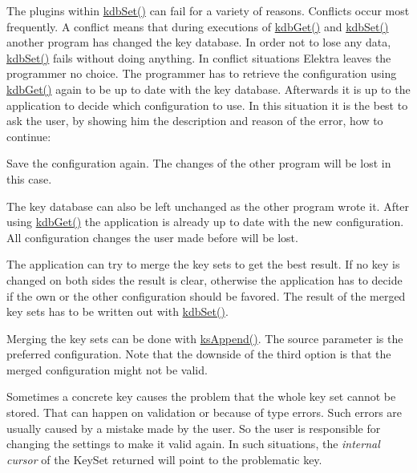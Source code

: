 The plugins within {\ttfamily \mbox{\hyperlink{group__kdb_ga11436b058408f83d303ca5e996832bcf}{kdb\+Set()}}} can fail for a variety of reasons. Conflicts occur most frequently. A conflict means that during executions of {\ttfamily \mbox{\hyperlink{group__kdb_ga28e385fd9cb7ccfe0b2f1ed2f62453a1}{kdb\+Get()}}} and {\ttfamily \mbox{\hyperlink{group__kdb_ga11436b058408f83d303ca5e996832bcf}{kdb\+Set()}}} another program has changed the key database. In order not to lose any data, {\ttfamily \mbox{\hyperlink{group__kdb_ga11436b058408f83d303ca5e996832bcf}{kdb\+Set()}}} fails without doing anything. In conflict situations Elektra leaves the programmer no choice. The programmer has to retrieve the configuration using {\ttfamily \mbox{\hyperlink{group__kdb_ga28e385fd9cb7ccfe0b2f1ed2f62453a1}{kdb\+Get()}}} again to be up to date with the key database. Afterwards it is up to the application to decide which configuration to use. In this situation it is the best to ask the user, by showing him the description and reason of the error, how to continue\+:


\begin{DoxyEnumerate}
\item Save the configuration again. The changes of the other program will be lost in this case.
\item The key database can also be left unchanged as the other program wrote it. After using {\ttfamily \mbox{\hyperlink{group__kdb_ga28e385fd9cb7ccfe0b2f1ed2f62453a1}{kdb\+Get()}}} the application is already up to date with the new configuration. All configuration changes the user made before will be lost.
\item The application can try to merge the key sets to get the best result. If no key is changed on both sides the result is clear, otherwise the application has to decide if the own or the other configuration should be favored. The result of the merged key sets has to be written out with {\ttfamily \mbox{\hyperlink{group__kdb_ga11436b058408f83d303ca5e996832bcf}{kdb\+Set()}}}.
\item Merging the key sets can be done with {\ttfamily \mbox{\hyperlink{group__keyset_ga21eb9c3a14a604ee3a8bdc779232e7b7}{ks\+Append()}}}. The source parameter is the preferred configuration. Note that the downside of the third option is that the merged configuration might not be valid.
\end{DoxyEnumerate}

Sometimes a concrete key causes the problem that the whole key set cannot be stored. That can happen on validation or because of type errors. Such errors are usually caused by a mistake made by the user. So the user is responsible for changing the settings to make it valid again. In such situations, the {\itshape internal cursor} of the {\ttfamily Key\+Set} {\ttfamily returned} will point to the problematic key.


